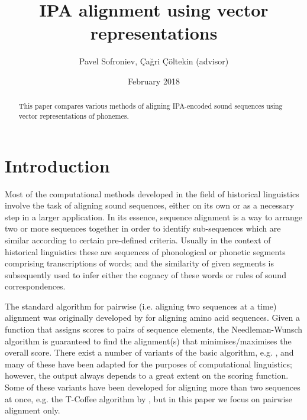 \documentclass[a4paper]{report}
\begin{document}
\title{IPA alignment using vector representations}
\author{Pavel Sofroniev, Çağri Çöltekin (advisor)}
\date{February 2018}
\maketitle

\begin{abstract}
	This paper compares various methods of aligning IPA-encoded sound sequences using vector representations of phonemes.
\end{abstract}


\chapter{Introduction}

Most of the computational methods developed in the field of historical linguistics involve the task of aligning sound sequences,
either on its own or as a necessary step in a larger application.
In its essence, sequence alignment is a way to arrange two or more sequences together
in order to identify sub-sequences which are similar according to certain pre-defined criteria.
Usually in the context of historical linguistics these are sequences of phonological or phonetic segments comprising transcriptions of words;
and the similarity of given segments is subsequently used to infer either the cognacy of these words or rules of sound correspondences.

The standard algorithm for pairwise (i.e. aligning two sequences at a time) alignment
was originally developed by \citet{1970_Needleman_Wunsch} for aligning amino acid sequences.
Given a function that assigns scores to pairs of sequence elements,
the Needleman-Wunsch algorithm is guaranteed to find the alignment(s) that minimises/maximises the overall score.
There exist a number of variants of the basic algorithm, e.g. \citet{1981_Smith_Waterman},
and many of these have been adapted for the purposes of computational linguistics;
however, the output always depends to a great extent on the scoring function.
Some of these variants have been developed for aligning more than two sequences at once,
e.g. the T-Coffee algorithm by \citet{2000_Notredame_al}, but in this paper we focus on pairwise alignment only.
\end{document}
